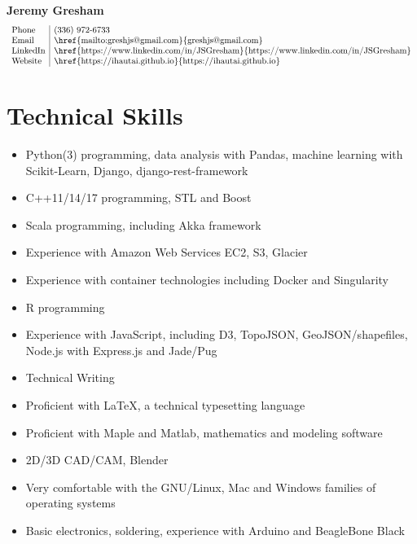 \documentclass[11pt]{article}
\begin{document}
\begin{center}
{\bf\Large Jeremy Gresham}\\
\vspace{1em}
\[
\begin{array}{l|l}
\setlength{\arraycolsep}{1pt}
\mbox{Phone} & $(336) 972-6733$ \\
\mbox{Email} & $\href{mailto:greshjs@gmail.com}{greshjs@gmail.com}$ \\
\mbox{LinkedIn} & $\href{https://www.linkedin.com/in/JSGresham}{https://www.linkedin.com/in/JSGresham}$ \\
\mbox{Website} & $\href{https://ihautai.github.io}{https://ihautai.github.io}$ \\
\end{array}
\]

\end{center}


\section*{Technical Skills}

\begin{itemize}
\setlength{\itemsep}{.5pt}
\item Python(3) programming, data analysis with Pandas, machine learning with Scikit-Learn, Django, django-rest-framework
\item C++11/14/17 programming, STL and Boost
\item Scala programming, including Akka framework
\item Experience with Amazon Web Services EC2, S3, Glacier
\item Experience with container technologies including Docker and Singularity
\item R programming
\item Experience with JavaScript, including D3, TopoJSON, GeoJSON/shapefiles,
 Node.js with Express.js and Jade/Pug
\item Technical Writing
\item	Proficient with {\rmfamily \LaTeX}, a technical typesetting language
\item Proficient with Maple and Matlab, mathematics and modeling software
\item	2D/3D CAD/CAM, Blender
\item Very comfortable with the GNU/Linux, Mac and Windows families of operating systems
\item	Basic electronics, soldering, experience with Arduino and BeagleBone Black
\end{itemize}
\end{document}
